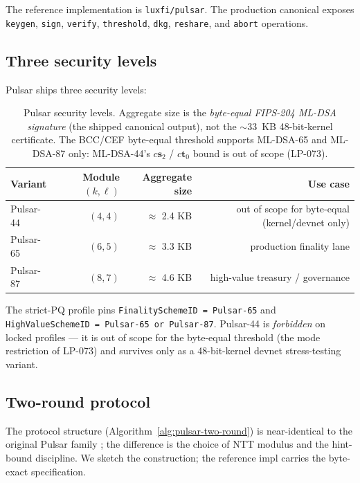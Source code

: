 The reference implementation is \texttt{luxfi/pulsar}. The
production canonical exposes \texttt{keygen}, \texttt{sign}, \texttt{verify},
\texttt{threshold}, \texttt{dkg}, \texttt{reshare}, and \texttt{abort}
operations.

\subsection{Three security levels}

Pulsar ships three security levels:

\begin{table}[H]
\centering
\caption{Pulsar security levels. Aggregate size is the \emph{byte-equal
FIPS-204 ML-DSA signature} (the shipped canonical output), not the
$\sim 33$~KB 48-bit-kernel certificate. The BCC/CEF byte-equal threshold
supports ML-DSA-65 and ML-DSA-87 only: ML-DSA-44's $c\mathbf{s}_2$ /
$c\mathbf{t}_0$ bound is out of scope (LP-073).}
\label{tab:pulsar-levels}
\begin{tabular}{lrrr}
\toprule
Variant & Module $(k,\ell)$ & Aggregate size & Use case \\
\midrule
Pulsar-44 & $(4,4)$ & $\approx$ 2.4 KB & out of scope for byte-equal (kernel/devnet only) \\
Pulsar-65 & $(6,5)$ & $\approx$ 3.3 KB & production finality lane \\
Pulsar-87 & $(8,7)$ & $\approx$ 4.6 KB & high-value treasury / governance \\
\bottomrule
\end{tabular}
\end{table}

The strict-PQ profile pins \texttt{FinalitySchemeID = Pulsar-65} and
\texttt{HighValueSchemeID = Pulsar-65 or Pulsar-87}. Pulsar-44 is
\emph{forbidden} on locked profiles --- it is out of scope for the
byte-equal threshold (the mode restriction of LP-073) and survives only as
a 48-bit-kernel devnet stress-testing variant.

\subsection{Two-round protocol}

The protocol structure (Algorithm~\ref{alg:pulsar-two-round}) is
near-identical to the original Pulsar family \cite{lp073}; the difference is
the choice of NTT modulus and the hint-bound discipline. We sketch the
construction; the reference impl carries the byte-exact specification.

